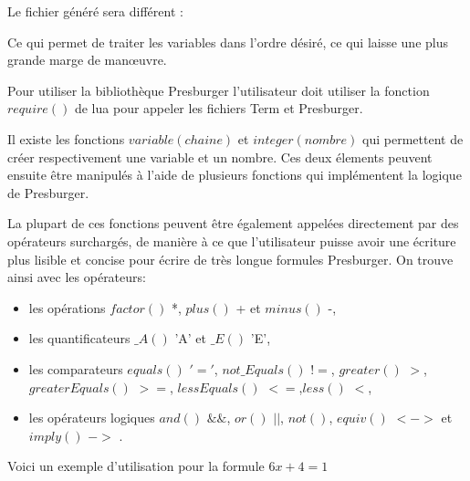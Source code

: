 Le fichier généré sera différent : \vspace{0.5cm}


Ce qui permet de traiter les variables dans l'ordre désiré, ce qui laisse une plus grande marge de man\oe{}uvre.\\\par

Pour utiliser la bibliothèque Presburger l'utilisateur doit utiliser la fonction $require()$ de lua pour appeler les fichiers Term et Presburger.\\\par

Il existe les fonctions $variable(chaine)$ et $integer(nombre)$ qui permettent de créer respectivement une variable et un nombre. Ces deux élements peuvent ensuite être manipulés à l'aide de plusieurs fonctions qui implémentent la logique de Presburger.\\\par

La plupart de ces fonctions peuvent être également appelées directement par des opérateurs surchargés, de manière à ce que l'utilisateur puisse avoir une écriture plus lisible et concise pour écrire de très longue formules Presburger. On trouve ainsi avec les opérateurs:
\begin{itemize}
 \item les opérations $factor()$ *, $plus()$ + et $minus()$ -,
 \item les quantificateurs $\_A()$ 'A' et $\_E()$ 'E',
 \item les comparateurs $equals()$ $'='$, $not\_Equals()$ $!=$, $greater()$ $>$,\\$greaterEquals()$ $>=$, $lessEquals()$ $<=$,$less()$ $<$,
 \item les opérateurs logiques $and()$ $\&\&$, $or()$ $||$, $not()$, $equiv()$ $<->$  et $imply()$ $->$ .
\end{itemize}
Voici un exemple d'utilisation pour la formule $6x + 4 = 1$\\
 

